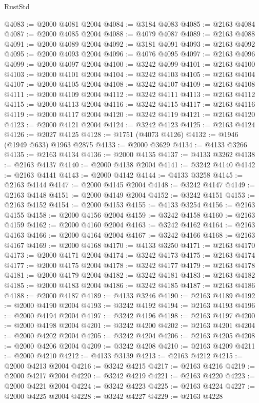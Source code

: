 \begin{lexlean}{RustStd}
\begin{coremodule}
@4083 := @2000 @4081 @2004
@4084 := @3184 @4083
@4085 := @2163 @4084
@4087 := @2000 @4085 @2004
@4088 := @4079 @4087
@4089 := @2163 @4088
@4091 := @2000 @4089 @2004
@4092 := @3181 @4091
@4093 := @2163 @4092
@4095 := @2000 @4093 @2004
@4096 := @4076 @4095
@4097 := @2163 @4096
@4099 := @2000 @4097 @2004
@4100 := @3242 @4099
@4101 := @2163 @4100
@4103 := @2000 @4101 @2004
@4104 := @3242 @4103
@4105 := @2163 @4104
@4107 := @2000 @4105 @2004
@4108 := @3242 @4107
@4109 := @2163 @4108
@4111 := @2000 @4109 @2004
@4112 := @3242 @4111
@4113 := @2163 @4112
@4115 := @2000 @4113 @2004
@4116 := @3242 @4115
@4117 := @2163 @4116
@4119 := @2000 @4117 @2004
@4120 := @3242 @4119
@4121 := @2163 @4120
@4123 := @2000 @4121 @2004
@4124 := @3242 @4123
@4125 := @2163 @4124
@4126 := @2027 @4125
@4128 := @1751 (@4073 @4126)
@4132 := @1946 (@1949 @633) @1963 @2875
@4133 := @2000 @3629
@4134 := @4133 @3266
@4135 := @2163 @4134
@4136 := @2000 @4135
@4137 := @4133 @3262
@4138 := @2163 @4137
@4140 := @2000 @4138 @2004
@4141 := @3242 @4140
@4142 := @2163 @4141
@4143 := @2000 @4142
@4144 := @4133 @3258
@4145 := @2163 @4144
@4147 := @2000 @4145 @2004
@4148 := @3242 @4147
@4149 := @2163 @4148
@4151 := @2000 @4149 @2004
@4152 := @3242 @4151
@4153 := @2163 @4152
@4154 := @2000 @4153
@4155 := @4133 @3254
@4156 := @2163 @4155
@4158 := @2000 @4156 @2004
@4159 := @3242 @4158
@4160 := @2163 @4159
@4162 := @2000 @4160 @2004
@4163 := @3242 @4162
@4164 := @2163 @4163
@4166 := @2000 @4164 @2004
@4167 := @3242 @4166
@4168 := @2163 @4167
@4169 := @2000 @4168
@4170 := @4133 @3250
@4171 := @2163 @4170
@4173 := @2000 @4171 @2004
@4174 := @3242 @4173
@4175 := @2163 @4174
@4177 := @2000 @4175 @2004
@4178 := @3242 @4177
@4179 := @2163 @4178
@4181 := @2000 @4179 @2004
@4182 := @3242 @4181
@4183 := @2163 @4182
@4185 := @2000 @4183 @2004
@4186 := @3242 @4185
@4187 := @2163 @4186
@4188 := @2000 @4187
@4189 := @4133 @3246
@4190 := @2163 @4189
@4192 := @2000 @4190 @2004
@4193 := @3242 @4192
@4194 := @2163 @4193
@4196 := @2000 @4194 @2004
@4197 := @3242 @4196
@4198 := @2163 @4197
@4200 := @2000 @4198 @2004
@4201 := @3242 @4200
@4202 := @2163 @4201
@4204 := @2000 @4202 @2004
@4205 := @3242 @4204
@4206 := @2163 @4205
@4208 := @2000 @4206 @2004
@4209 := @3242 @4208
@4210 := @2163 @4209
@4211 := @2000 @4210
@4212 := @4133 @3139
@4213 := @2163 @4212
@4215 := @2000 @4213 @2004
@4216 := @3242 @4215
@4217 := @2163 @4216
@4219 := @2000 @4217 @2004
@4220 := @3242 @4219
@4221 := @2163 @4220
@4223 := @2000 @4221 @2004
@4224 := @3242 @4223
@4225 := @2163 @4224
@4227 := @2000 @4225 @2004
@4228 := @3242 @4227
@4229 := @2163 @4228

\end{coremodule}
\end{lexlean}

